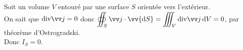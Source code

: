 \documentclass[a4paper]{article}
\begin{document}
\pagestyle{fancy}
\fancyhf{}
\setlength{\headheight}{15pt}

\begin{center}
	\large{}
\end{center}


Soit un volume $V$ entouré par une surface $S$ orientée vers l'extérieur. \\
On sait que \( \mathrm{div} \vv j = 0 \) donc \( \displaystyle\oiint_S \vv j\cdot\vv{\mathrm{d}S} = \displaystyle\iiint_V \mathrm{div}\vv j\,\mathrm{d}V = 0 \), par théorème d'Ostrogradski. \\
Donc \( I_S = 0 \).
\begin{center}
\end{center}
\end{document}
